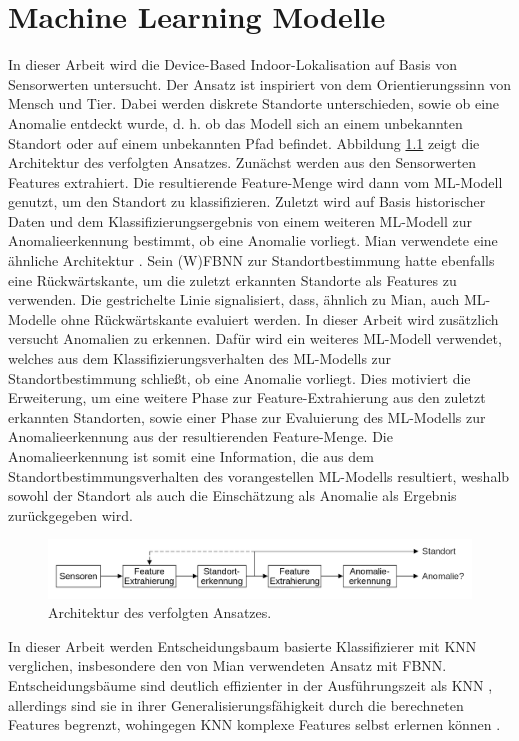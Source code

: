 \chapter{Machine Learning Modelle}
In dieser Arbeit wird die Device-Based Indoor-Lokalisation auf Basis von Sensorwerten untersucht.
Der Ansatz ist inspiriert von dem Orientierungssinn von Mensch und Tier.
Dabei werden diskrete Standorte unterschieden, sowie ob eine Anomalie entdeckt wurde,
d. h. ob das Modell sich an einem unbekannten Standort oder auf einem unbekannten Pfad befindet.
\newline
\newline
Abbildung \ref{fig:model_idea} zeigt die Architektur des verfolgten Ansatzes.
Zunächst werden aus den Sensorwerten Features extrahiert.
Die resultierende Feature-Menge wird dann vom ML-Modell genutzt, um den Standort zu klassifizieren.
Zuletzt wird auf Basis historischer Daten und dem Klassifizierungsergebnis von einem weiteren ML-Modell zur Anomalieerkennung bestimmt, ob eine Anomalie vorliegt.
\newline
\newline
Mian verwendete eine ähnliche Architektur \cite{naveedThesis}.
Sein (W)FBNN zur Standortbestimmung hatte ebenfalls eine Rückwärtskante, um die zuletzt erkannten Standorte als Features zu verwenden.
Die gestrichelte Linie signalisiert, dass, ähnlich zu Mian, auch ML-Modelle ohne Rückwärtskante evaluiert werden.
In dieser Arbeit wird zusätzlich versucht Anomalien zu erkennen.
Dafür wird ein weiteres ML-Modell verwendet, welches aus dem Klassifizierungsverhalten des ML-Modells zur Standortbestimmung schließt, ob eine Anomalie vorliegt.
Dies motiviert die Erweiterung, um eine weitere Phase zur Feature-Extrahierung aus den zuletzt erkannten Standorten,
sowie einer Phase zur Evaluierung des ML-Modells zur Anomalieerkennung aus der resultierenden Feature-Menge.
Die Anomalieerkennung ist somit eine Information, die aus dem Standortbestimmungsverhalten des vorangestellen ML-Modells resultiert,
weshalb sowohl der Standort als auch die Einschätzung als Anomalie als Ergebnis zurückgegeben wird.
\begin{figure}[h!]
    \centering
    \includegraphics[width=\linewidth]{images/model_idea.png}
    \caption{Architektur des verfolgten Ansatzes.}
    \label{fig:model_idea}
\end{figure}
\newline
In dieser Arbeit werden Entscheidungsbaum basierte Klassifizierer mit KNN verglichen, insbesondere den von Mian verwendeten Ansatz mit FBNN.
Entscheidungsbäume sind deutlich effizienter in der Ausführungszeit als KNN \cite{dymelThesis},
allerdings sind sie in ihrer Generalisierungsfähigkeit durch die berechneten Features begrenzt,
wohingegen KNN komplexe Features selbst erlernen können \cite{seide2011feature}.







